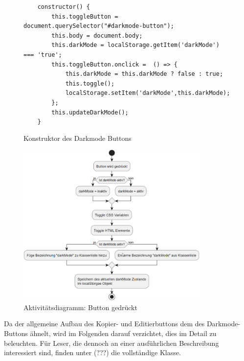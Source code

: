 \documentclass[11pt,a4paper]{report}
\begin{document}
\begin{figure}[h]
    \centering
    \begin{verbatim}
    constructor() {
        this.toggleButton = document.querySelector("#darkmode-button"); 
        this.body = document.body;
        this.darkMode = localStorage.getItem('darkMode') === 'true';
        this.toggleButton.onclick =  () => {
            this.darkMode = this.darkMode ? false : true;
            this.toggle();
            localStorage.setItem('darkMode',this.darkMode);
        };
        this.updateDarkMode();
    }
    \end{verbatim}
    \caption{Konstruktor des Darkmode Buttons}
    \label{fig:darkMode_constructor}
\end{figure}
\begin{figure}[h!]
    \centering
    \includegraphics[width=0.85\textwidth]{images/Button_pressed_activity.png}
    \caption{Aktivitätsdiagramm: Button gedrückt}
    \label{fig:button_pressed_activity}
\end{figure}
\newpage
Da der allgemeine Aufbau des Kopier- und Editierbuttons dem des Darkmode-Buttons ähnelt, wird im Folgenden darauf verzichtet, dies im Detail zu beleuchten. Für Leser, die dennoch an einer ausführlichen Beschreibung interessiert sind, finden unter (???) die vollständige Klasse.
\end{document}
